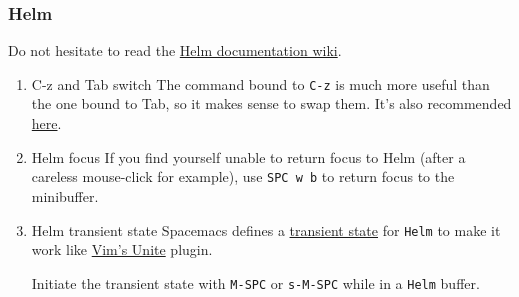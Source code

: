 \documentclass[11pt]{article}
\begin{document}
\subsubsection{Helm}
\label{sec:orga940194}
Do not hesitate to read the \href{https://github.com/emacs-helm/helm/wiki}{Helm documentation wiki}.

\begin{enumerate}
\item C-z and Tab switch
\label{sec:org137cc1a}
The command bound to \texttt{C-z} is much more useful than the one bound to Tab, so it
makes sense to swap them. It's also recommended \href{http://tuhdo.github.io/helm-intro.html}{here}.

\item Helm focus
\label{sec:org52dfc68}
If you find yourself unable to return focus to Helm (after a careless
mouse-click for example), use \texttt{SPC w b} to return focus to the minibuffer.

\item Helm transient state
\label{sec:org70b4995}
Spacemacs defines a \hyperref[sec:orgb0bb9d9]{transient state} for \texttt{Helm} to make it work like \href{https://github.com/Shougo/unite.vim}{Vim's Unite}
plugin.

Initiate the transient state with \texttt{M-SPC} or \texttt{s-M-SPC} while in a \texttt{Helm} buffer.


\end{enumerate}
\end{document}
